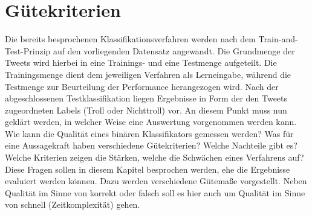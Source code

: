 \section{Gütekriterien}\label{metrics}\raggedbottom
Die bereits besprochenen Klassifikationsverfahren werden nach dem \glqq Train-and-Test\grqq-Prinzip auf den vorliegenden Datensatz angewandt. Die Grundmenge der Tweets wird hierbei in eine Trainings- und eine Testmenge aufgeteilt. Die Trainingsmenge dient dem jeweiligen Verfahren als Lerneingabe, während die Testmenge zur Beurteilung der Performance herangezogen wird. Nach der abgeschlossenen Testklassifikation liegen Ergebnisse in Form der den Tweets zugeordneten Labels (Troll oder Nichttroll) vor. An diesem Punkt muss nun geklärt werden, in welcher Weise eine Auswertung vorgenommen werden kann. Wie kann die Qualität eines binären Klassifikators gemessen werden? Was für eine Aussagekraft haben verschiedene Gütekriterien? Welche Nachteile gibt es? Welche Kriterien zeigen die Stärken, welche die Schwächen eines Verfahrens auf? Diese Fragen sollen in diesem Kapitel besprochen werden, ehe die Ergebnisse evaluiert werden können. Dazu werden verschiedene Gütemaße \citep{perfmetrics2015} vorgestellt. Neben Qualität im Sinne von korrekt oder falsch soll es hier auch um Qualität im Sinne von schnell (Zeitkomplexität) gehen. 

